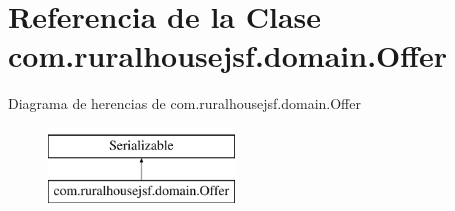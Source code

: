 \hypertarget{classcom_1_1ruralhousejsf_1_1domain_1_1_offer}{}\section{Referencia de la Clase com.\+ruralhousejsf.\+domain.\+Offer}
\label{classcom_1_1ruralhousejsf_1_1domain_1_1_offer}
Diagrama de herencias de com.\+ruralhousejsf.\+domain.\+Offer\begin{figure}[H]
\begin{center}
\leavevmode
\includegraphics[height=2.000000cm]{db/db8/classcom_1_1ruralhousejsf_1_1domain_1_1_offer}
\end{center}
\end{figure}
